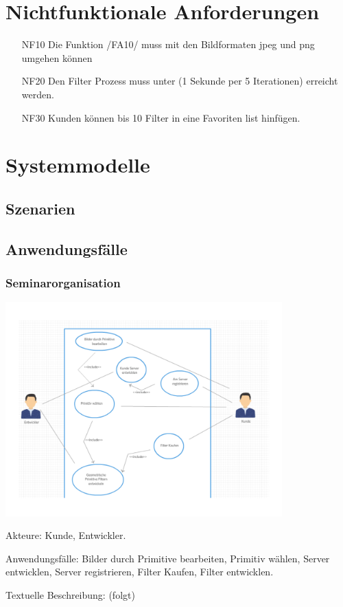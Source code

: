 \documentclass[parskip=full]{scrartcl}
\begin{document}
\section{Nichtfunktionale Anforderungen}
\begin{itemize}[nosep]
\item[NF10] Die Funktion /FA10/ muss mit den Bildformaten jpeg und png umgehen können
\item[NF20] Den Filter Prozess muss unter (1 Sekunde per 5 Iterationen) erreicht werden.
\item[NF30] Kunden können bis 10 Filter in eine Favoriten list hinfügen.
\end{itemize}

\section{Systemmodelle}

\subsection{Szenarien}

\subsection{Anwendungsfälle}
\subsubsection{Seminarorganisation}
\begin{center}
\includegraphics[width=0.8\textwidth]{szenario_seminar1.pdf}
\end{center}

Akteure: Kunde, Entwickler.

Anwendungsfälle: Bilder durch Primitive bearbeiten, Primitiv wählen, Server entwicklen, Server registrieren, Filter Kaufen, Filter entwicklen.

Textuelle Beschreibung: (folgt)



%
%
\printnoidxglossaries
\end{document}
